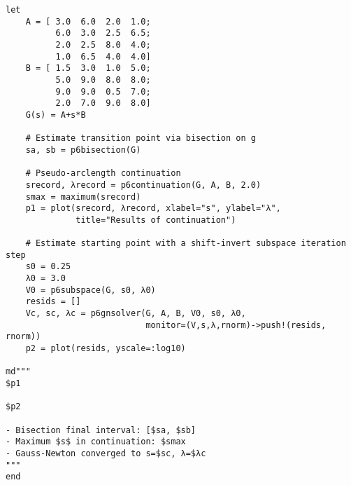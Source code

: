 \documentclass[12pt, leqno]{article} %
\begin{document}
\begin{verbatim}
let
    A = [ 3.0  6.0  2.0  1.0;
          6.0  3.0  2.5  6.5;
          2.0  2.5  8.0  4.0;
          1.0  6.5  4.0  4.0]
    B = [ 1.5  3.0  1.0  5.0;
          5.0  9.0  8.0  8.0;
          9.0  9.0  0.5  7.0;
          2.0  7.0  9.0  8.0]
    G(s) = A+s*B

    # Estimate transition point via bisection on g
    sa, sb = p6bisection(G)

    # Pseudo-arclength continuation
    srecord, λrecord = p6continuation(G, A, B, 2.0)
    smax = maximum(srecord)
    p1 = plot(srecord, λrecord, xlabel="s", ylabel="λ",
              title="Results of continuation")

    # Estimate starting point with a shift-invert subspace iteration step
    s0 = 0.25
    λ0 = 3.0
    V0 = p6subspace(G, s0, λ0)
    resids = []
    Vc, sc, λc = p6gnsolver(G, A, B, V0, s0, λ0,
                            monitor=(V,s,λ,rnorm)->push!(resids, rnorm))
    p2 = plot(resids, yscale=:log10)

md"""
$p1

$p2

- Bisection final interval: [$sa, $sb]
- Maximum $s$ in continuation: $smax
- Gauss-Newton converged to s=$sc, λ=$λc
"""
end
\end{verbatim}
\end{document}
